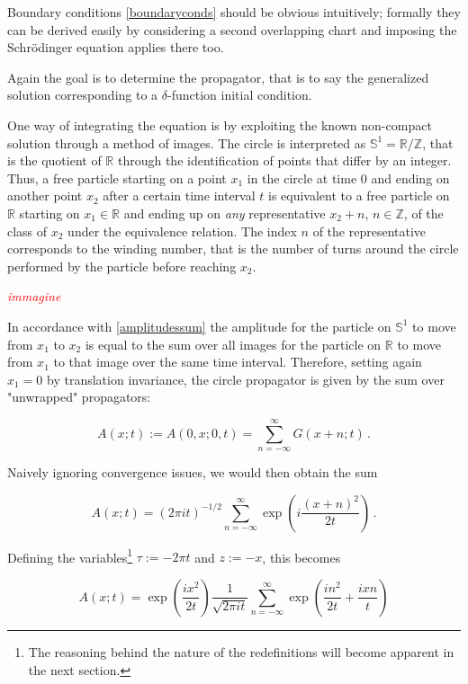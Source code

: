 \documentclass{article}
\newcommand{\ess}{\ensuremath{\mathbb{S}}}
\newcommand{\ar}{\ensuremath{\mathbb{R}}}
\newcommand{\cmnt}[1]{\textcolor{red}{\emph{#1}}}
\newcommand{\sumZ}{\sum_{n=-\infty}^{\infty}}
\begin{document}
Boundary conditions \eqref{boundaryconds} should be obvious intuitively; formally they can be derived easily by considering a second overlapping chart and imposing the Schr\"odinger equation applies there too.

Again the goal is to determine the propagator, that is to say the generalized solution corresponding to a $\delta$-function initial condition.

One way of integrating the equation is by exploiting the known non-compact solution through a method of images. The circle is interpreted as $\ess^1 = \ar / \mathbb{Z}$, that is the quotient of $\ar$ through the identification of points that differ by an integer. Thus, a free particle starting on a point $x_1$ in the circle at time $0$ and ending on another point $x_2$ after a certain time interval $t$ is equivalent to a free particle on $\mathbb{R}$ starting on $x_1 \in \mathbb{R}$ and ending up on \emph{any} representative $x_2 + n$, $n\in\mathbb{Z}$, of the class of $x_2$ under the equivalence relation. The index $n$ of the representative corresponds to the winding number, that is the number of turns around the circle performed by the particle before reaching $x_2$.

\cmnt{immagine}

In accordance with \eqref{amplitudessum} the amplitude for the particle on $\ess^1$ to move from $x_1$ to $x_2$ is equal to the sum over all images for the particle on $\ar$ to move from $x_1$ to that image over the same time interval. Therefore, setting again $x_1 = 0$ by translation invariance, the circle propagator is given by the sum over "unwrapped" propagators:

\begin{equation}
    A(x;t) := A(0,x;0,t) = \sumZ G(x + n; t)\,.
\end{equation}

Naively ignoring convergence issues, we would then obtain the sum

\begin{equation}
    A(x;t) = (2\pi i t)^{-1/2} \sumZ \exp(i \frac{(x+ n)^2}{2t})\,.
\end{equation}

Defining the variables\footnote{The reasoning behind the nature of the redefinitions will become apparent in the next section.} $\tau := - 2\pi t $ and $z := - x$, this becomes

\begin{equation}
    A(x;t) = \exp(\frac{ix^2}{2t}) \frac{1}{\sqrt{2\pi i t}} \sumZ \exp( \frac{in^2}{2t} + \frac{ixn}{t} ) 
\end{equation}
\end{document}
